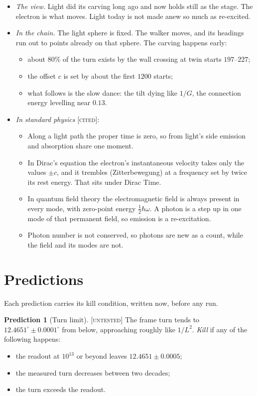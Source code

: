 \documentclass[11pt]{article}
\theoremstyle{definition}
\newtheorem{prediction}{Prediction}
\theoremstyle{remark}
\newcommand{\grade}[1]{\textsc{[#1]}}
\begin{document}
\begin{itemize}
\item \emph{The view.} Light did its carving long ago and now holds still as the stage. The electron is what moves. Light today is not made anew so much as re-excited.
\item \emph{In the chain.} The light sphere is fixed. The walker moves, and its headings run out to points already on that sphere. The carving happens early:
  \begin{itemize}
  \item about $80\%$ of the turn exists by the wall crossing at twin starts $197$--$227$;
  \item the offset $c$ is set by about the first $1200$ starts;
  \item what follows is the slow dance: the tilt dying like $1/G$, the connection energy levelling near $0.13$.
  \end{itemize}
\item \emph{In standard physics} \grade{cited}:
  \begin{itemize}
  \item Along a light path the proper time is zero, so from light's side emission and absorption share one moment.
  \item In Dirac's equation the electron's instantaneous velocity takes only the values $\pm c$, and it trembles (Zitterbewegung) at a frequency set by twice its rest energy. That sits under Dirac Time.
  \item In quantum field theory the electromagnetic field is always present in every mode, with zero-point energy $\tfrac12\hbar\omega$. A photon is a step up in one mode of that permanent field, so emission is a re-excitation.
  \item Photon number is not conserved, so photons are new as a count, while the field and its modes are not.
  \end{itemize}
\end{itemize}

\section{Predictions}

\noindent Each prediction carries its kill condition, written now, before any run.

\begin{prediction}[Turn limit] \grade{untested}
The frame turn tends to $12.4651^\circ\pm0.0001^\circ$ from below, approaching roughly like $1/L^2$.
\emph{Kill} if any of the following happens:
\begin{itemize}
\item the readout at $10^{13}$ or beyond leaves $12.4651\pm0.0005$;
\item the measured turn decreases between two decades;
\item the turn exceeds the readout.
\end{itemize}
\end{prediction}
\end{document}
